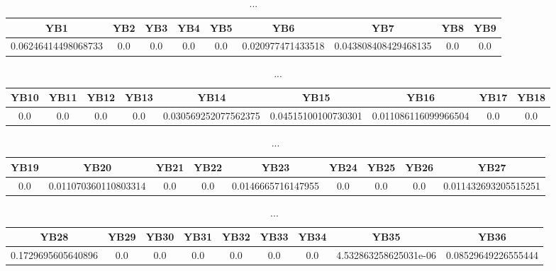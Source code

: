 \documentclass[]{article}
\begin{document}
\begin{table}[h]
      \centering
      \begin{tabular}{|c|c|c|c|c|c|c|c|c|}
            \hline
            YB1                 & YB2 & YB3 & YB4 & YB5 & YB6               & YB7                  & YB8 & YB9 \\
            \hline
            0.06246414498068733 & 0.0 & 0.0 & 0.0 & 0.0 & 0.020977471433518 & 0.043808408429468135 & 0.0 & 0.0 \\
            \hline
      \end{tabular}
      \caption{...}
\end{table}
\begin{table}[h]
      \centering
      \begin{tabular}{|c|c|c|c|c|c|c|c|c|}
            \hline
            YB10 & YB11 & YB12 & YB13 & YB14                 & YB15                & YB16                 & YB17 & YB18 \\
            \hline
            0.0  & 0.0  & 0.0  & 0.0  & 0.030569252077562375 & 0.04515100100730301 & 0.011086116099966504 & 0.0  & 0.0  \\
            \hline
      \end{tabular}
      \caption{...}
\end{table}
\begin{table}[h]
      \centering
      \begin{tabular}{|c|c|c|c|c|c|c|c|c|}
            \hline
            YB19 & YB20                 & YB21 & YB22 & YB23               & YB24 & YB25 & YB26 & YB27                 \\
            \hline
            0.0  & 0.011070360110803314 & 0.0  & 0.0  & 0.0146665716147955 & 0.0  & 0.0  & 0.0  & 0.011432693205515251 \\
            \hline
      \end{tabular}
      \caption{...}
\end{table}
\begin{table}[h]
      \centering
      \begin{tabular}{|c|c|c|c|c|c|c|c|c|}
            \hline
            YB28               & YB29 & YB30 & YB31 & YB32 & YB33 & YB34 & YB35                  & YB36                \\
            \hline
            0.1729695605640896 & 0.0  & 0.0  & 0.0  & 0.0  & 0.0  & 0.0  & 4.532863258625031e-06 & 0.08529649226555444 \\
            \hline
      \end{tabular}
      \caption{...}
\end{table}
\end{document}
